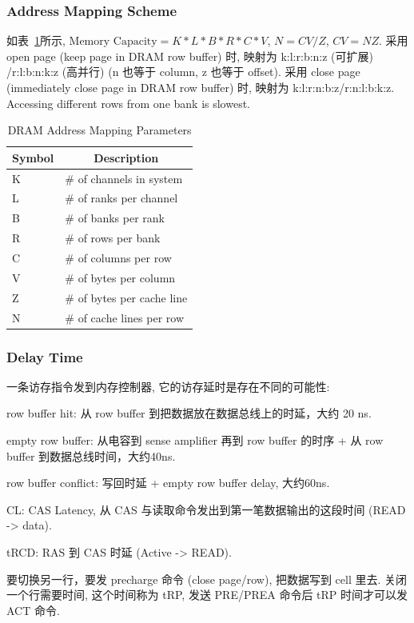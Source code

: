 \documentclass[UTF8,12pt,a4paper]{article}
\begin{document}
\subsubsection{Address Mapping Scheme}
如表~\ref{tab:dram_address_mapping}所示,
$\text{Memory Capacity} = K*L*B*R*C*V$,
$N = CV/Z$, $CV = NZ$.
采用 open page (keep page in DRAM row buffer) 时,
映射为 k:l:r:b:n:z (可扩展) /r:l:b:n:k:z (高并行) (n 也等于 column, z 也等于 offset).
采用 close page (immediately close page in DRAM row buffer) 时,
映射为 k:l:r:n:b:z/r:n:l:b:k:z.
Accessing different rows from one bank is slowest.
\begin{table}
  \begin{small}
    \caption{DRAM Address Mapping Parameters}
    \label{tab:dram_address_mapping}
    \begin{center}
      \begin{tabular}[c]{l|l}
        \hline
        \multicolumn{1}{c|}{\textbf{Symbol}} & 
        \multicolumn{1}{c}{\textbf{Description}} \\
        \hline
        K & \# of channels in system \\
        L & \# of ranks per channel \\
        B & \# of banks per rank \\
        R & \# of rows per bank \\
        C & \# of columns per row \\
        V & \# of bytes per column \\
        Z & \# of bytes per cache line \\
        N & \# of cache lines per row \\
        \hline
      \end{tabular}
    \end{center}
  \end{small}
\end{table}
\subsubsection{Delay Time}
一条访存指令发到内存控制器, 它的访存延时是存在不同的可能性:
\begin{compactitem}
  \item row buffer hit: 从 row buffer 到把数据放在数据总线上的时延，大约 20 ns.
  \item empty row buffer: 从电容到 sense amplifier 再到 row buffer 的时序 + 从 row buffer 到数据总线时间，大约40ns.
  \item row buffer conflict: 写回时延 + empty row buffer delay, 大约60ns.
  \item CL: CAS Latency, 从 CAS 与读取命令发出到第一笔数据输出的这段时间 (READ -> data).
  \item tRCD: RAS 到 CAS 时延 (Active -> READ).
  \item 要切换另一行，要发 precharge 命令 (close page/row), 把数据写到 cell 里去.
  关闭一个行需要时间, 这个时间称为 tRP, 发送 PRE/PREA 命令后 tRP 时间才可以发 ACT 命令.
\end{compactitem}
\end{document}
